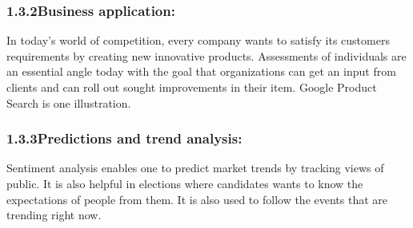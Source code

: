\documentclass[12pt]{article}
\begin{document}
\subsubsection*{1.3.2\hspace*{10pt}Business application:}
\begin{justify}
\tab In today’s world of competition, every company wants to satisfy its customers requirements by creating new innovative products. Assessments of individuals are an essential angle today with the goal that organizations can get an input from clients and can roll out sought improvements in their item. Google Product Search is one illustration.
\end{justify}\par

\subsubsection*{1.3.3\hspace*{10pt}Predictions and trend analysis:}
\begin{justify}
\tab Sentiment analysis enables one to predict market trends by tracking views of public. It is also helpful in elections where candidates wants to know the expectations of people from them. It is also used to follow the events that are trending right now.
\end{justify}\par


\vspace{\baselineskip}

\newpage

\vspace{\baselineskip}

\vspace{\baselineskip}

\vspace{\baselineskip}

\vspace{\baselineskip}

\vspace{\baselineskip}

\vspace{\baselineskip}

\vspace{\baselineskip}
\end{document}
